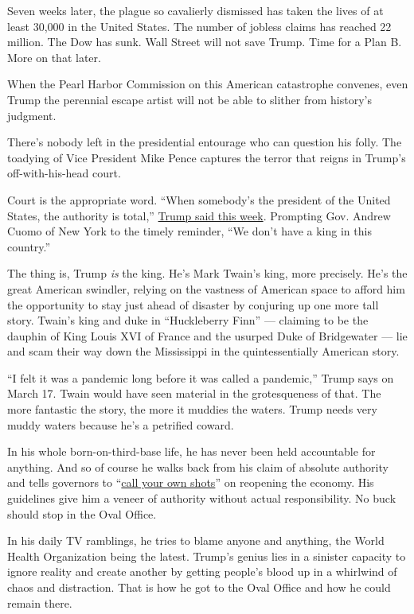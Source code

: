 Seven weeks later, the plague so cavalierly dismissed has taken the
lives of at least 30,000 in the United States. The number of jobless
claims has reached 22 million. The Dow has sunk. Wall Street will not
save Trump. Time for a Plan B. More on that later.

When the Pearl Harbor Commission on this American catastrophe convenes,
even Trump the perennial escape artist will not be able to slither from
history's judgment.

There's nobody left in the presidential entourage who can question his
folly. The toadying of Vice President Mike Pence captures the terror
that reigns in Trump's off-with-his-head court.

Court is the appropriate word. ``When somebody's the president of the
United States, the authority is total,''
\href{https://www.nytimes3xbfgragh.onion/2020/04/13/us/politics/trump-coronavirus-governors.html}{Trump
said this week}. Prompting Gov. Andrew Cuomo of New York to the timely
reminder, ``We don't have a king in this country.''

The thing is, Trump \emph{is} the king. He's Mark Twain's king, more
precisely. He's the great American swindler, relying on the vastness of
American space to afford him the opportunity to stay just ahead of
disaster by conjuring up one more tall story. Twain's king and duke in
``Huckleberry Finn'' --- claiming to be the dauphin of King Louis XVI of
France and the usurped Duke of Bridgewater --- lie and scam their way
down the Mississippi in the quintessentially American story.

``I felt it was a pandemic long before it was called a pandemic,'' Trump
says on March 17. Twain would have seen material in the grotesqueness of
that. The more fantastic the story, the more it muddies the waters.
Trump needs very muddy waters because he's a petrified coward.

In his whole born-on-third-base life, he has never been held accountable
for anything. And so of course he walks back from his claim of absolute
authority and tells governors to
``\href{https://www.cnn.com/2020/04/16/politics/donald-trump-reopening-guidelines-coronavirus/index.html}{call
your own shots}'' on reopening the economy. His guidelines give him a
veneer of authority without actual responsibility. No buck should stop
in the Oval Office.

In his daily TV ramblings, he tries to blame anyone and anything, the
World Health Organization being the latest. Trump's genius lies in a
sinister capacity to ignore reality and create another by getting
people's blood up in a whirlwind of chaos and distraction. That is how
he got to the Oval Office and how he could remain there.

